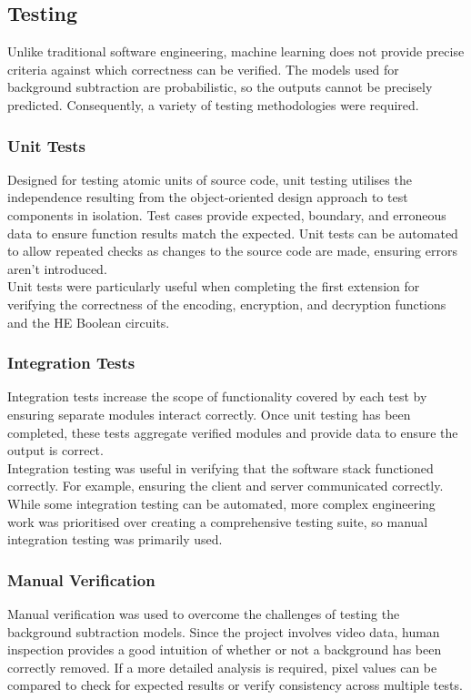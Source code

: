 \subsection{Testing}
\label{sec:testing}
\indent \indent
Unlike traditional software engineering, machine learning does not provide precise criteria against which correctness can be verified. The models used for background subtraction are probabilistic, so the outputs cannot be precisely predicted.  Consequently, a variety of testing methodologies were required.
\subsubsection{Unit Tests}
\indent \indent
Designed for testing atomic units of source code, unit testing utilises the independence resulting from the object-oriented design approach to test components in isolation. Test cases provide expected, boundary, and erroneous data to ensure function results match the expected. Unit tests can be automated to allow repeated checks as changes to the source code are made, ensuring errors aren't introduced.
\smallskip \\ \indent
Unit tests were particularly useful when completing the first extension for verifying the correctness of the encoding, encryption, and decryption functions and the HE Boolean circuits.
\subsubsection{Integration Tests}
\indent \indent
Integration tests increase the scope of functionality covered by each test by ensuring separate modules interact correctly. Once unit testing has been completed, these tests aggregate verified modules and provide data to ensure the output is correct.
\smallskip \\ \indent
Integration testing was useful in verifying that the software stack functioned correctly. For example, ensuring the client and server communicated correctly. While some integration testing can be automated, more complex engineering work was prioritised over creating a comprehensive testing suite, so manual integration testing was primarily used.
\subsubsection{Manual Verification}
\indent \indent
Manual verification was used to overcome the challenges of testing the background subtraction models. Since the project involves video data, human inspection provides a good intuition of whether or not a background has been correctly removed. If a more detailed analysis is required, pixel values can be compared to check for expected results or verify consistency across multiple tests.






